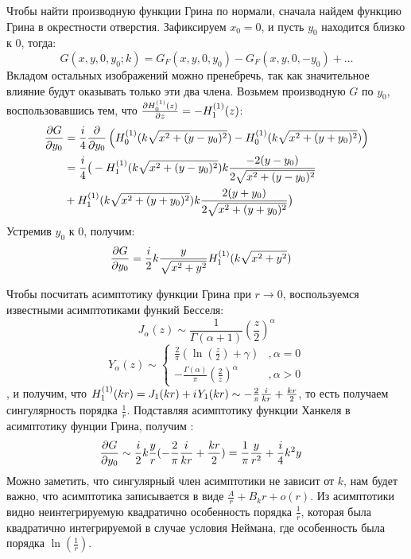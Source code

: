 Чтобы найти производную функции Грина по нормали, сначала найдем функцию Грина в окрестности отверстия. Зафиксируем $x_0 = 0$, и пусть $y_0$ находится близко к $0$, тогда:
\[
G(x, y, 0, y_0; k) = G_F(x, y, 0, y_0) - G_F(x, y, 0, -y_0) + \dots
\]
Вкладом остальных изображений можно пренебречь, так как значительное влияние будут оказывать только эти два члена. Возьмем производную $G$ по $y_0$, воспользовавшись тем, что $\pdv{H_{0}^{(1)}(z)}{z} = - H_{1}^{(1)}(z)$:
\begin{align*}
\pdv{G}{y_0}
&= \frac{i}{4} \pdv{}{y_0} \left( H_{0}^{(1)}(k \sqrt{x^2 + (y - y_0)^2}) - H_{0}^{(1)}(k \sqrt{x^2 + (y + y_0)^2}) \right) \\
&= \frac{i}{4} \big( -H_{1}^{(1)}(k \sqrt{x^2 + (y - y_0)^2}) k \frac{-2 (y - y_0)}{2 \sqrt{x^2 + (y - y_0)^2}} \\
&+ H_{1}^{(1)}(k \sqrt{x^2 + (y + y_0)^2}) k \frac{2 (y + y_0)}{2 \sqrt{x^2 + (y + y_0)^2}} \big)
\end{align*}
Устремив $y_0$ к 0, получим:
\begin{align*}
\pdv{G}{y_0} (x, y, 0, 0; k)
&= \frac{i}{2} k \frac{y}{\sqrt{x^2 + y^2}} H_{1}^{(1)}(k \sqrt{x^2 + y^2})
\end{align*}

Чтобы посчитать асимптотику функции Грина при $r \to 0$, воспользуемся известными асимптотиками функий Бесселя:
\[
J_\alpha(z) \sim \frac{1}{\Gamma(\alpha+1)} \left( \frac{z}{2} \right) ^\alpha
\]
\[
Y_\alpha(z) \sim
\begin{cases}
\frac{2}{\pi} \left ( \ln \left (\frac{z}{2} \right ) + \gamma \right )  &, \alpha=0\\
-\frac{\Gamma(\alpha)}{\pi} \left( \frac{2}{z} \right) ^\alpha &, \alpha > 0
\end{cases}
\]
, и получим, что $H_{1}^{(1)}(k r) = J_1(k r) + {i\mkern1mu} Y_1(k r) \sim - \frac{2}{\pi} \frac{{i\mkern1mu} }{k r} + \frac{k r}{2}$, то есть получаем сингулярность порядка $\frac{1}{r}$. Подставляя асимптотику функции Ханкеля в асимптотику фунции Грина, получим :
\begin{align*}
\pdv{G}{y_0} (x, y, 0, 0; k)
&\sim \frac{i}{2} k \frac{y}{r} (- \frac{2}{\pi} \frac{{i\mkern1mu} }{k r} + \frac{k r}{2}) = \frac{1}{\pi} \frac{y}{r^2} + \frac{i}{4} k^2 y
\end{align*} 
Можно заметить, что сингулярный член асимптотики не зависит от $k$, нам будет важно, что асимптотика записывается в виде $\frac{A}{r} + B_k r + o(r)$. Из асимптотики видно неинтегрируемую квадратично особенность порядка $\frac{1}{r}$, которая была квадратично интегрируемой в случае условия Неймана, где особенность была порядка $\ln(\frac{1}{r})$.

